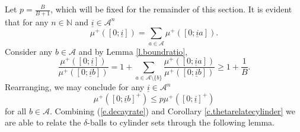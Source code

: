 \documentclass{amsart}
\newcommand{\NN}{\mathbb{N}}
\newcommand{\A}{\mathcal{A}}
\begin{document}
Let $p = \frac{B}{B+1}$, which will be fixed for the remainder of this section. It is evident that for any $n\in \NN$ and $\underline{i}\in \A^n$
\[\mu^+([0;\underline{i}]) = \sum_{a\in \A} \mu^+([0;\underline{i}a]).\]
Consider any $b\in \A$ and by Lemma \ref{l.boundratio},
\[\frac{\mu^+([0;\underline{i}])}{\mu^+([0;\underline{i}b])} = 1 + \sum_{a\in \A\setminus \{b\}} \frac{\mu^+([0;\underline{i}a])}{\mu^+([0;\underline{i}b])} \geq 1 + \frac{1}{B}.\]
Rearranging, we may conclude for any $\underline{i}\in \A^n$
\begin{equation}\label{e.decayrate}
    \mu^+([0;\underline{i}b]^+) \leq p\mu^+([0;\underline{i}]^+)
\end{equation}
for all $b\in \A$. Combining (\ref{e.decayrate}) and Corollary \ref{c.thetarelatecylinder} we are able to relate the $\delta$-balls to cylinder sets through the following lemma.
\end{document}
